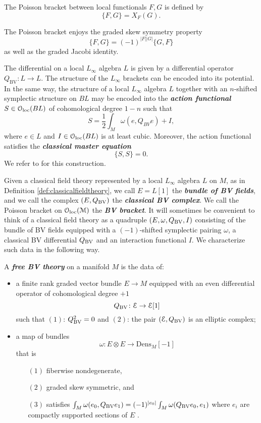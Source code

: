 \documentclass[10pt, oneside]{article}
\newcommand{\Dens}{\mathrm{Dens}}
\newcommand{\defterm}[1]{\textbf{\emph{#1}}}
\begin{document}
\begin{definition}
The Poisson bracket between local functionals $F, G$ is defined by
\[\{F, G\} = X_F (G).\]
\end{definition}

The Poisson bracket enjoys the graded skew symmetry property
\[\{F, G\} = (-1)^{|F| |G|} \{G, F\}\]
as well as the graded Jacobi identity.

The differential on a local $L_\infty$ algebra $L$ is given by a differential operator $Q_{\mathrm{BV}}\colon L\rightarrow L$. The structure of the $L_\infty$ brackets can be encoded into its potential. In the same way, the structure of a local $L_\infty$ algebra $L$ together with an $n$-shifted symplectic structure on $BL$ may be encoded into the \defterm{action functional} $S\in\mathcal{O}_{\rm loc}(BL)$ of cohomological degree $1-n$ such that
\[S = \frac{1}{2}\int_M\omega(e, Q_{BV} e) + I,\]
where $e\in L$ and $I\in\mathcal{O}_{\rm loc}(BL)$ is at least cubic. Moreover, the action functional satisfies the \defterm{classical master equation}
\[\{S, S\} = 0.\]
We refer to \cite[Proposition 5.4.0.2]{Book2} for this construction.

Given a classical field theory represented by a local $L_\infty$ algebra $L$ on $M$, as in Definition \ref{def:classicalfieldtheory}, we call $E=L[1]$ the \defterm{bundle of BV fields}, and we call the complex $(E, Q_{\mathrm{BV}})$ the \defterm{classical BV complex}. We call the Poisson bracket on $\mathcal{O}_{\rm loc}(\mathcal M)$ the \defterm{BV bracket}. It will sometimes be convenient to think of a classical field theory as a quadruple $(E, \omega, Q_{\mathrm{BV}}, I)$ consisting of the bundle of BV fields equipped with a $(-1)$-shifted symplectic pairing $\omega$, a classical BV differential $Q_{\mathrm{BV}}$ and an interaction functional $I$.  We characterize such data in the following way.

\begin{definition}
A \defterm{free BV theory} on a manifold $M$ is the data of:
\begin{itemize}
\item a finite rank graded vector bundle $E \to M$ equipped with an even differential operator of cohomological degree $+1$
\[
Q_{\mathrm{BV}} \colon \mathcal E \to \mathcal E [1] 
\]
such that $(1)$: $Q_{\mathrm{BV}}^2 = 0$ and $(2)$: the pair $(\mathcal E , Q_{\mathrm{BV}})$ is an elliptic complex;
\item a map of bundles
\[
\omega\colon E \otimes E \to \Dens_M [-1]
\]
that is
\begin{enumerate}
\item[$(1)$] fiberwise nondegenerate,
\item[$(2)$] graded skew symmetric, and
\item[$(3)$] satisfies $\int_M \omega(e_0, Q_{\mathrm{BV}} e_1) = (-1)^{|e_0|} \int_M \omega(Q_{\mathrm{BV}} e_0, e_1)$ where $e_i$ are compactly supported sections of $E$ .
\end{enumerate}
\end{itemize}
\end{definition}
\end{document}

